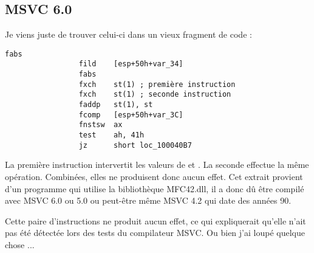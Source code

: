 ﻿\subsection{MSVC 6.0}

Je viens juste de trouver celui-ci dans un vieux fragment de code :

\begin{lstlisting}[style=customasmx86]
                 fabs
                 fild    [esp+50h+var_34]
                 fabs
                 fxch    st(1) ; première instruction
                 fxch    st(1) ; seconde instruction
                 faddp   st(1), st
                 fcomp   [esp+50h+var_3C]
                 fnstsw  ax
                 test    ah, 41h
                 jz      short loc_100040B7
\end{lstlisting}

La première instruction  intervertit les valeurs de  et . La seconde
effectue la même opération. Combinées, elles ne produisent donc aucun effet.
Cet extrait provient d'un programme qui utilise la bibliothèque MFC42.dll, il a donc dû être compilé
avec MSVC 6.0 ou 5.0 ou peut-être même MSVC 4.2 qui date des années 90.

Cette paire d'instructions ne produit aucun effet, ce qui expliquerait qu'elle n'ait pas été détectée
lors des tests du compilateur MSVC. Ou bien j'ai loupé quelque chose ...

